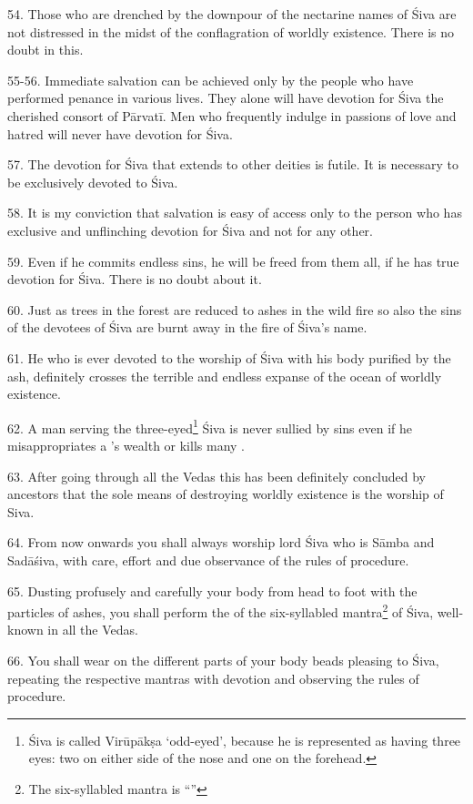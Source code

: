 54. Those who are drenched by the downpour of the nectarine names of Śiva are
not distressed in the midst of the conflagration of worldly existence. There is
no doubt in this.

55-56. Immediate salvation can be achieved only by the people who have performed
penance in various lives. They alone will have devotion for Śiva the cherished
consort of Pārvatī. Men who frequently indulge in passions of love and hatred
will never have devotion for Śiva.

57. The devotion for Śiva that extends to other deities is futile. It is
necessary to be exclusively devoted to Śiva.

58. It is my conviction that salvation is easy of access only to the person who
has exclusive and unflinching devotion for Śiva and not for any other.

59. Even if he commits endless sins, he will be freed from them all, if he has
true devotion for Śiva. There is no doubt about it.

60. Just as trees in the forest are reduced to ashes in the wild fire so also
the sins of the devotees of Śiva are burnt away in the fire of Śiva’s name.

61. He who is ever devoted to the worship of Śiva with his body purified by
the ash, definitely crosses the terrible and endless expanse of the ocean of
worldly existence.

62. A man serving the three-eyed\footnote{Śiva is called Virūpākṣa ‘odd-eyed’,
because he is represented as having three eyes: two on either side of the nose
and one on the forehead.} Śiva is never sullied by sins even if he
misappropriates a ’s wealth or kills many .

63. After going through all the Vedas this has been definitely concluded by
ancestors that the sole means of destroying worldly existence is the worship
of Siva.

64. From now onwards you shall always worship lord Śiva who is Sāmba and
Sadāśiva, with care, effort and due observance of the rules of procedure.

65. Dusting profusely and carefully your body from head to foot with
the particles of ashes, you shall perform the  of the six-syllabled
mantra\footnote{The six-syllabled mantra is “”} of Śiva,
well-known in all the Vedas.

66. You shall wear on the different parts of your body  beads
pleasing to Śiva, repeating the respective mantras with devotion and observing
the rules of procedure.

